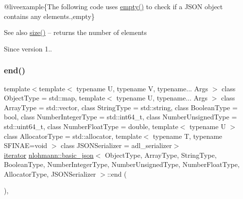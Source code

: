 @liveexample\{The following code uses {\ttfamily \mbox{\hyperlink{classnlohmann_1_1basic__json_a1a86d444bfeaa9518d2421aedd74444a}{empty()}}} to check if a J\+S\+ON object contains any elements.,empty\}

\begin{DoxySeeAlso}{See also}
\mbox{\hyperlink{classnlohmann_1_1basic__json_a25e27ad0c6d53c01871c5485e1f75b96}{size()}} -- returns the number of elements
\end{DoxySeeAlso}
\begin{DoxySince}{Since}
version 1.. 
\end{DoxySince}
\mbox{\label{classnlohmann_1_1basic__json_a13e032a02a7fd8a93fdddc2fcbc4763c}} 
\subsubsection{\texorpdfstring{end()}{end()}\hspace{0.1cm}{\footnotesize\ttfamily [1/2]}}
{\footnotesize\ttfamily template$<$template$<$ typename U, typename V, typename... Args $>$ class Object\+Type = std\+::map, template$<$ typename U, typename... Args $>$ class Array\+Type = std\+::vector, class String\+Type  = std\+::string, class Boolean\+Type  = bool, class Number\+Integer\+Type  = std\+::int64\+\_\+t, class Number\+Unsigned\+Type  = std\+::uint64\+\_\+t, class Number\+Float\+Type  = double, template$<$ typename U $>$ class Allocator\+Type = std\+::allocator, template$<$ typename T, typename S\+F\+I\+N\+A\+E=void $>$ class J\+S\+O\+N\+Serializer = adl\+\_\+serializer$>$ \\
\mbox{\hyperlink{classnlohmann_1_1basic__json_a099316232c76c034030a38faa6e34dca}{iterator}} \mbox{\hyperlink{classnlohmann_1_1basic__json}{nlohmann\+::basic\+\_\+json}}$<$ Object\+Type, Array\+Type, String\+Type, Boolean\+Type, Number\+Integer\+Type, Number\+Unsigned\+Type, Number\+Float\+Type, Allocator\+Type, J\+S\+O\+N\+Serializer $>$\+::end (\begin{DoxyParamCaption}{ }\end{DoxyParamCaption})\hspace{0.3cm}{\ttfamily [inline]}, {\ttfamily [noexcept]}}



